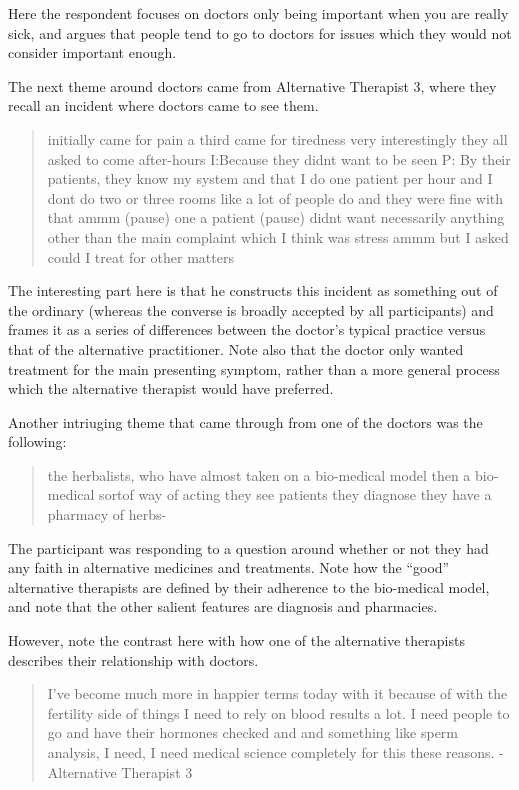 Here the respondent focuses on doctors only being important when you are really sick, and argues that people tend to go to doctors for issues which they would not consider important enough. 

The next theme around doctors came from Alternative Therapist 3, where they recall an incident where doctors came to see them. 

\begin{quotation}
  initially came for pain a third came for tiredness very interestingly they all asked to come after-hours 
I:Because they didnt want to be seen
P: By their patients, they know my system and that I do one patient per hour and I dont do two or three rooms like a lot of people do and they were fine with that ammm (pause) one a patient (pause) didnt want necessarily anything other than the main complaint which I think was stress ammm but I asked could I treat for other matters 

\end{quotation}

The interesting part here is that he constructs this incident as something out of the ordinary (whereas the converse is broadly accepted by all participants) and frames it as a series of differences between the doctor's typical practice versus that of the alternative practitioner. Note also that the doctor only wanted treatment for the main presenting symptom, rather than a more general process which the alternative therapist would have preferred. 

Another intriuging theme that came through from one of the doctors was the following: 

\begin{quotation}
  the herbalists, who have almost taken on a bio-medical model then a bio-medical sortof way of acting they see patients they diagnose they have a pharmacy of herbs-

\end{quotation}

The participant was responding to a question around whether or not they had any faith in alternative medicines and treatments. Note how the ``good'' alternative therapists are defined by their adherence to the bio-medical model, and note that the other salient features are diagnosis and pharmacies. 

However, note the contrast here with how one of the alternative therapists describes their relationship with doctors. 

\begin{quotation}
  I've become much more in happier terms today with it because of with the fertility side of things I need to rely on blood results a lot. I need people to go and have their hormones checked and and something like sperm analysis, I need, I need medical science completely for this these reasons.
- Alternative Therapist 3
\end{quotation}


